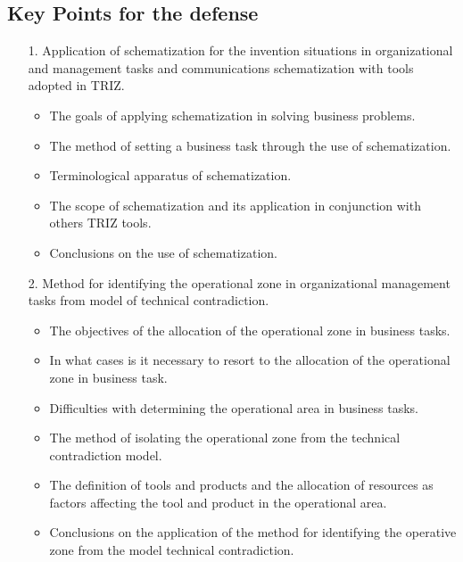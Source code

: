 \subsection{Key Points for the defense}
\begin{itemize}
\item[1.] Application of schematization for the invention situations in
  organizational and management tasks and communications schematization with
  tools adopted in TRIZ.
\begin{itemize}
\item The goals of applying schematization in solving business problems.
\item The method of setting a business task through the use of schematization.
\item Terminological apparatus of schematization.
\item The scope of schematization and its application in conjunction with
  others TRIZ tools.
\item Conclusions on the use of schematization.
\end{itemize}
\item[2.] Method for identifying the operational zone in organizational
  management tasks from model of technical contradiction.
\begin{itemize}
\item The objectives of the allocation of the operational zone in business
  tasks.
\item In what cases is it necessary to resort to the allocation of the
  operational zone in business task.
\item Difficulties with determining the operational area in business tasks.
\item The method of isolating the operational zone from the technical
  contradiction model.
\item The definition of tools and products and the allocation of resources as
  factors affecting the tool and product in the operational area.
\item Conclusions on the application of the method for identifying the
  operative zone from the model technical contradiction.
\end{itemize}
\end{itemize}


